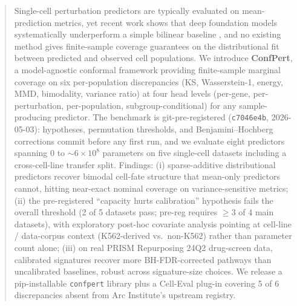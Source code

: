 \documentclass{article}
\begin{document}

\printAffiliationsAndNotice{}

\begin{abstract}
Single-cell perturbation predictors are typically evaluated on mean-prediction metrics, yet recent work shows that deep foundation models systematically underperform a simple bilinear baseline \citep{ahlmann2025, csendes2025}, and no existing method gives finite-sample coverage guarantees on the distributional fit between predicted and observed cell populations. We introduce \textbf{ConfPert}, a model-agnostic conformal framework providing finite-sample marginal coverage on six per-population discrepancies (KS, Wasserstein-1, energy, MMD, bimodality, variance ratio) at four head levels (per-gene, per-perturbation, per-population, subgroup-conditional) for any sample-producing predictor. The benchmark is git-pre-registered (\texttt{c7046e4b}, 2026-05-03): hypotheses, permutation thresholds, and Benjamini--Hochberg corrections commit before any first run, and we evaluate eight predictors spanning $0$ to $\sim 6{\times}10^8$ parameters on five single-cell datasets including a cross-cell-line transfer split. Findings: (i) sparse-additive distributional predictors recover bimodal cell-fate structure that mean-only predictors cannot, hitting near-exact nominal coverage on variance-sensitive metrics; (ii) the pre-registered ``capacity hurts calibration'' hypothesis fails the overall threshold (2 of 5 datasets pass; pre-reg requires $\geq 3$ of 4 main datasets), with exploratory post-hoc covariate analysis pointing at cell-line / data-corpus context (K562-derived vs.\ non-K562) rather than parameter count alone; (iii) on real PRISM Repurposing 24Q2 drug-screen data, calibrated signatures recover more BH-FDR-corrected pathways than uncalibrated baselines, robust across signature-size choices. We release a pip-installable \texttt{confpert} library plus a Cell-Eval plug-in covering 5 of 6 discrepancies absent from Arc Institute's upstream registry.
\end{abstract}
\end{document}
